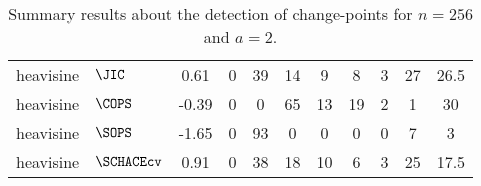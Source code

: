 \begin{table}[ht]
\begin{tabular}{llccccccccc}
  heavisine & $\JIC$ &  0.61 &     0 &    39 &    14 &     9 &     8 &     3 &    27 &  26.5 \\ 
  heavisine & $\COPS$ & -0.39 &     0 &     0 &    65 &    13 &    19 &     2 &     1 &    30 \\ 
  heavisine & $\SOPS$ & -1.65 &     0 &    93 &     0 &     0 &     0 &     0 &     7 &     3 \\ 
  heavisine & $\SCHACEcv$ &  0.91 &     0 &    38 &    18 &    10 &     6 &     3 &    25 &  17.5 \\ 
  \end{tabular}
\caption{Summary results about the detection of change-points for $n = 256$ and $a = 2$.} 
\label{tab:CPn256a2}
\end{table}
